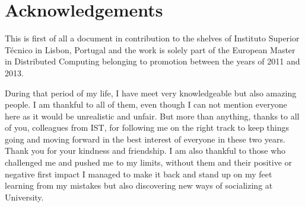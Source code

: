 \newpage


\chapter*{Acknowledgements}
\thispagestyle{empty}


This is first of all a document in contribution to the shelves of Instituto Superior Técnico in Lisbon, Portugal and the work is solely part of the European Master in Distributed Computing belonging to promotion between the years of 2011 and 2013. 

During that period of my life, I have meet very knowledgeable but also amazing people. I am thankful to all of them, even though I can not mention everyone here as it would be unrealistic and unfair. But more than anything, thanks to all of you, colleagues from IST, for following me on the right track to keep things going and moving forward in the best interest of everyone in these two years. Thank you for your kindness and friendship. I am also thankful to those who challenged me and pushed me to my limits, without them and their positive or negative first impact I managed to make it back and stand up on my feet learning from my mistakes but also discovering new ways of socializing at University.

